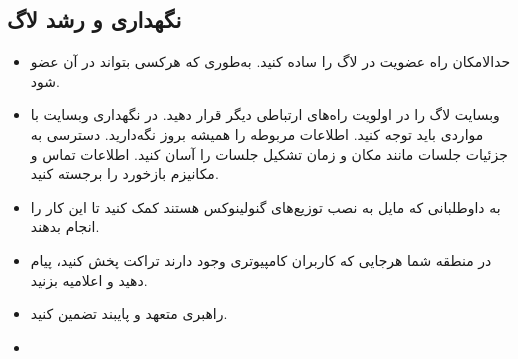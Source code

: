 \subsection{نگهداری و رشد لاگ}

\begin{itemize}
\item
حدالامکان راه عضویت در لاگ را ساده کنید. به‌طوری که هرکسی بتواند در آن عضو شود.
\item
وبسایت لاگ را در اولویت راه‌های ارتباطی دیگر قرار دهید. در نگهداری وبسایت
با مواردی باید توجه کنید. اطلاعات مربوطه را همیشه بروز نگه‌دارید.
دسترسی به جزئیات جلسات مانند مکان و زمان تشکیل جلسات را آسان کنید.
اطلاعات تماس و مکانیزم بازخورد را برجسته کنید.
\item
به داوطلبانی که مایل به نصب توزیع‌های گنولینوکس هستند کمک کنید تا
این کار را انجام بدهند.
\item
در منطقه شما هرجایی که کاربران کامپیوتری وجود دارند تراکت پخش کنید،
پیام دهید و اعلامیه بزنید.
\item
راهبری متعهد و پایبند تضمین کنید.
\item


\end{itemize}
